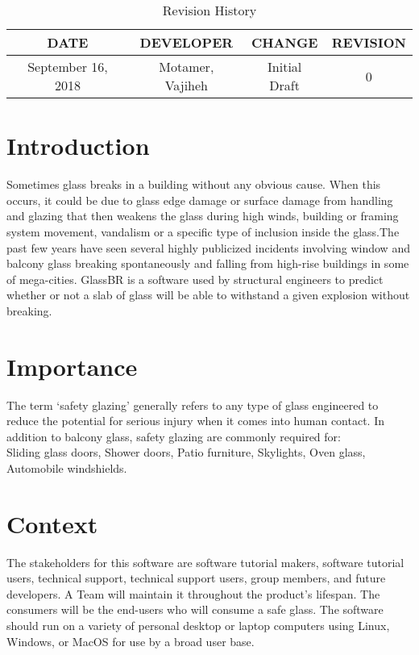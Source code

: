 \documentclass[12pt,letterpaper]{article} \usepackage[utf8]{inputenc}
\begin{document}
\maketitle

\begin{table}[hp] \caption{Revision History} \begin{center} \label{tab:}
\begin{tabular}{|c|c|c|c|} \hline \textbf{DATE} & \textbf{DEVELOPER} &
\textbf{CHANGE} & \textbf{REVISION}\\ \hline September 16, 2018 & Motamer,
Vajiheh & Initial Draft & 0\\ \hline \end{tabular} \end{center} \label{default}
\end{table}


\section{Introduction} Sometimes glass breaks in a building without any obvious
cause. When this occurs, it could be due to glass edge damage or surface damage
from handling and glazing that then weakens the glass during high winds, building
or framing system movement, vandalism or a specific type of inclusion inside the
glass.The past few years have seen several highly publicized incidents involving
window and balcony glass breaking spontaneously and falling from high-rise
buildings in some of mega-cities. GlassBR is a software used by structural
engineers to predict whether or not a slab of glass will be able to withstand a
given explosion without breaking.

\section{Importance} The term ‘safety glazing’ generally refers to any type of
glass engineered to reduce the potential for serious injury when it comes into
human contact. In addition to balcony glass, safety glazing are commonly
required for:\\ Sliding glass doors, Shower doors, Patio furniture, Skylights,
Oven glass, Automobile windshields.


\section{Context}

The stakeholders for this software are software tutorial makers, software
tutorial users, technical support, technical support users, group members, and
future developers. A Team will maintain it throughout the product’s lifespan.
The consumers will be the end-users who will consume a safe glass. The software
should run on a variety of personal desktop or laptop computers using Linux,
Windows, or MacOS for use by a broad user base.

\end{document}
